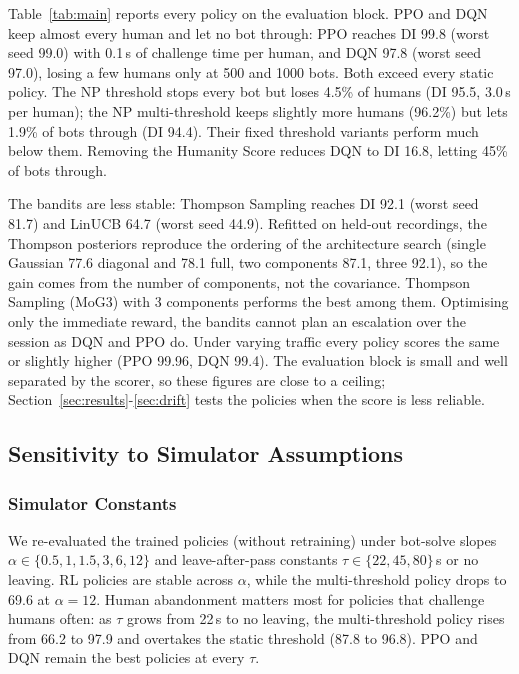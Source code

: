 \documentclass{ieeetj}
\begin{document}
Table~\ref{tab:main} reports every policy on the evaluation block.
PPO and DQN keep almost every human and let no bot through: PPO reaches DI 99.8 (worst seed 99.0) with 0.1\,s of challenge time per human, and DQN 97.8 (worst seed 97.0), losing a few humans only at 500 and 1000 bots. Both exceed every static policy. 
The NP threshold stops every bot but loses 4.5\% of humans (DI 95.5, 3.0\,s per human); the NP multi-threshold keeps slightly more humans (96.2\%) but lets 1.9\% of bots through (DI 94.4). 
Their fixed threshold variants perform much below them.
Removing the Humanity Score reduces DQN to DI 16.8, letting 45\% of bots through. 

The bandits are less stable: Thompson Sampling reaches DI 92.1 (worst seed 81.7) and LinUCB 64.7 (worst seed 44.9). 
Refitted on held-out recordings, the Thompson posteriors reproduce the ordering of the architecture search (single Gaussian 77.6 diagonal and 78.1 full, two components 87.1, three 92.1), so the gain comes from the number of components, not the covariance. 
Thompson Sampling (MoG3) with 3 components performs the best among them.
Optimising only the immediate reward, the bandits cannot plan an escalation over the session as DQN and PPO do. 
Under varying traffic every policy scores the same or slightly higher (PPO 99.96, DQN 99.4).
The evaluation block is small and well separated by the scorer, so these figures are close to a ceiling; Section~\ref{sec:results}-\ref{sec:drift} tests the policies when the score is less reliable.

\vspace{-5pt}
\subsection{Sensitivity to Simulator Assumptions}
\label{sec:sens}
\subsubsection{Simulator Constants}
We re-evaluated the trained policies (without retraining) under bot-solve slopes $\alpha\in\{0.5,1,1.5,3,6,12\}$ and leave-after-pass constants $\tau\in\{22,45,80\}$\,s or no leaving. 
RL policies are stable across $\alpha$, while the multi-threshold policy drops to 69.6 at $\alpha=12$. 
Human abandonment matters most for policies that challenge humans often: as $\tau$ grows from 22\,s to no leaving, the multi-threshold policy rises from 66.2 to 97.9 and overtakes the static threshold (87.8 to 96.8).
PPO and DQN remain the best policies at every $\tau$.
\end{document}
